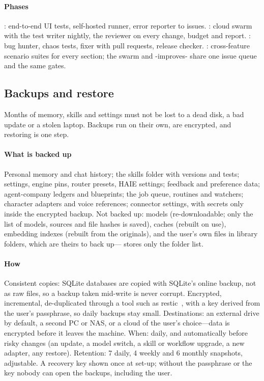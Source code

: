 \paragraph{Phases} : end-to-end UI tests, self-hosted runner, error reporter to issues. : cloud swarm with the test writer nightly, the reviewer on every change, budget and report. : bug hunter, chaos tests, fixer with pull requests, release checker. : cross-feature scenario suites for every section; the swarm and \hivi{}-improves-\hivi{} share one issue queue and the same gates.

\subsection{Backups and restore}

Months of memory, skills and settings must not be lost to a dead disk, a bad update or a stolen laptop. Backups run on their own, are encrypted, and restoring is one step.

\paragraph{What is backed up} Personal memory and chat history; the skills folder with versions and tests; settings, engine pins, router presets, HAIE settings; feedback and preference data; agent-company ledgers and blueprints; the job queue, routines and watchers; character adapters and voice references; connector settings, with secrets only inside the encrypted backup. Not backed up: models (re-downloadable; only the list of models, sources and file hashes is saved), caches (rebuilt on use), embedding indexes (rebuilt from the originals), and the user's own files in library folders, which are theirs to back up---\hivi{} stores only the folder list.

\paragraph{How} Consistent copies: SQLite databases are copied with SQLite's online backup, not as raw files, so a backup taken mid-write is never corrupt. Encrypted, incremental, de-duplicated through a tool such as restic~\cite{restic}, with a key derived from the user's passphrase, so daily backups stay small. Destinations: an external drive by default, a second PC or NAS, or a cloud of the user's choice---data is encrypted before it leaves the machine. When: daily, and automatically before risky changes (an update, a model switch, a skill or workflow upgrade, a new adapter, any restore). Retention: 7 daily, 4 weekly and 6 monthly snapshots, adjustable. A recovery key shown once at set-up; without the passphrase or the key nobody can open the backups, including the user.

